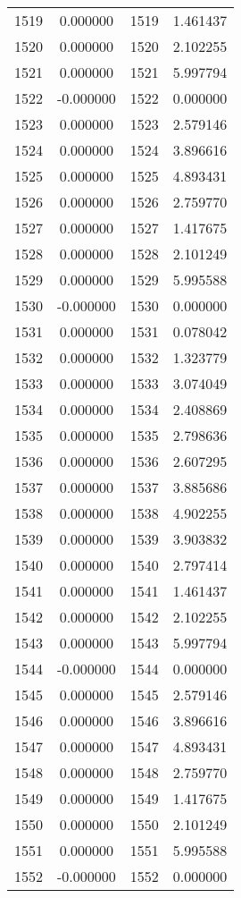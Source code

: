 \documentclass[12pt]{article}
\begin{document}
\begin{longtable}{@{}cccc@{}}
1519 & 0.000000 & 1519 & 1.461437 \\
1520 & 0.000000 & 1520 & 2.102255 \\
1521 & 0.000000 & 1521 & 5.997794 \\
1522 & -0.000000 & 1522 & 0.000000 \\
1523 & 0.000000 & 1523 & 2.579146 \\
1524 & 0.000000 & 1524 & 3.896616 \\
1525 & 0.000000 & 1525 & 4.893431 \\
1526 & 0.000000 & 1526 & 2.759770 \\
1527 & 0.000000 & 1527 & 1.417675 \\
1528 & 0.000000 & 1528 & 2.101249 \\
1529 & 0.000000 & 1529 & 5.995588 \\
1530 & -0.000000 & 1530 & 0.000000 \\
1531 & 0.000000 & 1531 & 0.078042 \\
1532 & 0.000000 & 1532 & 1.323779 \\
1533 & 0.000000 & 1533 & 3.074049 \\
1534 & 0.000000 & 1534 & 2.408869 \\
1535 & 0.000000 & 1535 & 2.798636 \\
1536 & 0.000000 & 1536 & 2.607295 \\
1537 & 0.000000 & 1537 & 3.885686 \\
1538 & 0.000000 & 1538 & 4.902255 \\
1539 & 0.000000 & 1539 & 3.903832 \\
1540 & 0.000000 & 1540 & 2.797414 \\
1541 & 0.000000 & 1541 & 1.461437 \\
1542 & 0.000000 & 1542 & 2.102255 \\
1543 & 0.000000 & 1543 & 5.997794 \\
1544 & -0.000000 & 1544 & 0.000000 \\
1545 & 0.000000 & 1545 & 2.579146 \\
1546 & 0.000000 & 1546 & 3.896616 \\
1547 & 0.000000 & 1547 & 4.893431 \\
1548 & 0.000000 & 1548 & 2.759770 \\
1549 & 0.000000 & 1549 & 1.417675 \\
1550 & 0.000000 & 1550 & 2.101249 \\
1551 & 0.000000 & 1551 & 5.995588 \\
1552 & -0.000000 & 1552 & 0.000000 \\

\end{longtable}
\end{document}
